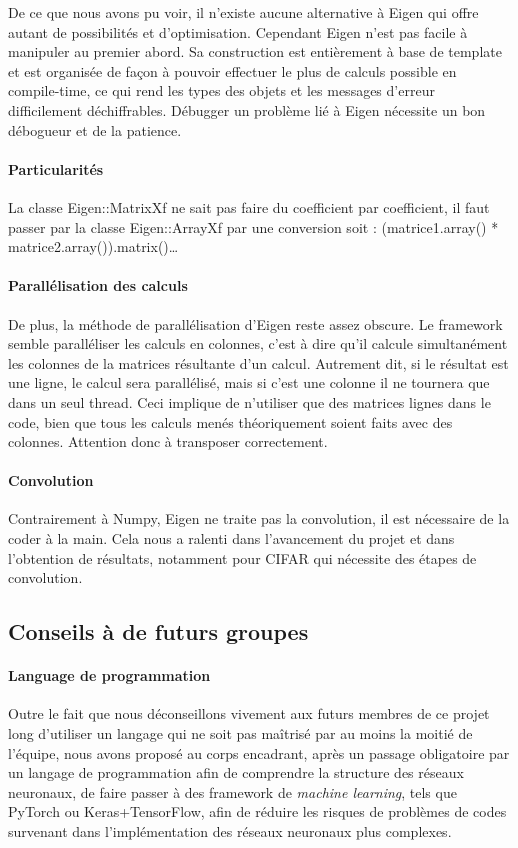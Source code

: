 De ce que nous avons pu voir, il n'existe aucune alternative à Eigen qui offre autant de possibilités et d'optimisation. Cependant Eigen n'est pas facile à manipuler au premier abord. Sa construction est entièrement à base de template et est organisée de façon à pouvoir effectuer le plus de calculs possible en compile-time, ce qui rend les types des objets et les messages d'erreur difficilement déchiffrables. Débugger un problème lié à Eigen nécessite un bon débogueur et de la patience. 

\paragraph{Particularités}
La classe Eigen::MatrixXf ne sait pas faire du coefficient par coefficient, il faut passer par la classe Eigen::ArrayXf par une conversion
soit : (matrice1.array() * matrice2.array()).matrix()…
\paragraph{Parallélisation des calculs}
De plus, la méthode de parallélisation d'Eigen reste assez obscure. Le framework semble paralléliser les calculs en colonnes, c'est à dire qu'il calcule simultanément les colonnes de la matrices résultante d'un calcul. Autrement dit, si le résultat est une ligne, le calcul sera parallélisé, mais si c'est une colonne il ne tournera que dans un seul thread. Ceci implique de n'utiliser que des matrices lignes dans le code, bien que tous les calculs menés théoriquement soient faits avec des colonnes. Attention donc à transposer correctement.
\paragraph{Convolution}\label{implementation-C++-convolution}
Contrairement à Numpy, Eigen ne traite pas la convolution, il est nécessaire de la coder à la main. Cela nous a ralenti dans l'avancement du projet et dans l'obtention de résultats, notamment pour CIFAR qui nécessite des étapes de convolution.

\subsection{Conseils à de futurs groupes}
\paragraph{Language de programmation}
Outre le fait que nous déconseillons vivement aux futurs membres de ce projet long d'utiliser un langage qui ne soit pas maîtrisé par au moins la moitié de l'équipe, nous avons proposé au corps encadrant, après un passage obligatoire par un langage de programmation afin de comprendre la structure des réseaux neuronaux, de faire passer à des framework de \textit{machine learning}, tels que PyTorch ou Keras+TensorFlow, afin de réduire les risques de problèmes de codes survenant dans l'implémentation des réseaux neuronaux plus complexes.
